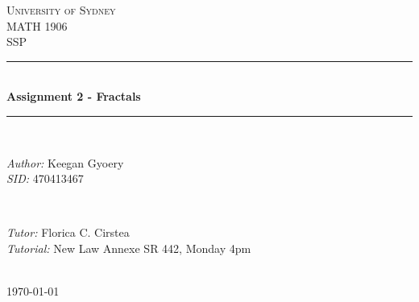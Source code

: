 \documentclass[a4paper]{article}
\begin{document}
\begin{titlepage}

\newcommand{\HRule}{\rule{\linewidth}{0.5mm}} %

\center %
 
\textsc{\LARGE University of Sydney}\\[1.5cm] %
\textsc{\Large MATH 1906}\\[0.5cm] %
\textsc{\large SSP}\\[0.5cm] %

\HRule \\[0.4cm]
{ \huge \bfseries Assignment 2 - Fractals}\\[0.4cm] %
\HRule \\[1.5cm]

\begin{minipage}{0.4\textwidth}
\begin{flushleft} \large
\emph{Author:}
Keegan Gyoery %
\\
\emph{SID:}
470413467
\end{flushleft}
\end{minipage}
~
\begin{minipage}{0.4\textwidth}
\begin{flushright} \large
\emph{Tutor:} 
Florica C. Cirstea %
\\
\emph{Tutorial:}
New Law Annexe SR 442, Monday 4pm
\end{flushright}
\end{minipage}\\[4cm]

{\large \today}\\[3cm] %

\vfill %

\end{titlepage}

\end{document}
